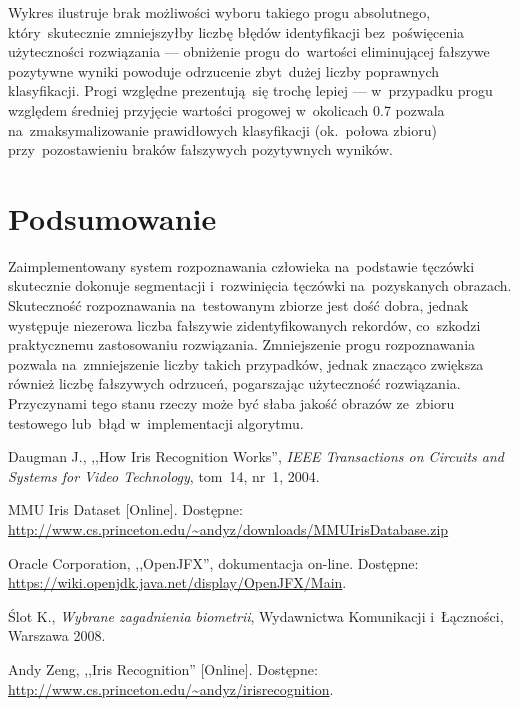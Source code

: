 \documentclass[11pt,a4paper]{article}
\begin{document}
Wykres ilustruje brak możliwości wyboru takiego progu absolutnego, który~skutecznie zmniejszyłby liczbę błędów identyfikacji bez~poświęcenia użyteczności rozwiązania --- obniżenie progu do~wartości eliminującej fałszywe pozytywne wyniki powoduje odrzucenie zbyt~dużej liczby poprawnych klasyfikacji.
Progi względne prezentują~się trochę lepiej --- w~przypadku progu względem średniej przyjęcie wartości progowej w~okolicach 0.7 pozwala na~zmaksymalizowanie prawidłowych klasyfikacji (ok.~połowa zbioru) przy~pozostawieniu braków fałszywych pozytywnych wyników.

\section{Podsumowanie}

Zaimplementowany system rozpoznawania człowieka na~podstawie tęczówki skutecznie dokonuje segmentacji i~rozwinięcia tęczówki na~pozyskanych obrazach.
Skuteczność rozpoznawania na~testowanym zbiorze jest dość dobra, jednak występuje niezerowa liczba fałszywie zidentyfikowanych rekordów, co~szkodzi praktycznemu zastosowaniu rozwiązania.
Zmniejszenie progu rozpoznawania pozwala na~zmniejszenie liczby takich przypadków, jednak znacząco zwiększa również liczbę fałszywych odrzuceń, pogarszając użyteczność rozwiązania.
Przyczynami tego stanu rzeczy może być słaba jakość obrazów ze~zbioru testowego lub~błąd w~implementacji algorytmu.

\begin{thebibliography}{9}

        Daugman J.,
        ,,How Iris Recognition Works'',
        \emph{IEEE Transactions on Circuits and Systems for Video Technology},
        tom~14,
        nr~1,
        2004.
        
        MMU Iris Dataset
        [Online].
        Dostępne: \url{http://www.cs.princeton.edu/~andyz/downloads/MMUIrisDatabase.zip}

        Oracle Corporation,
        ,,OpenJFX'',
        dokumentacja on-line.
        Dostępne: \url{https://wiki.openjdk.java.net/display/OpenJFX/Main}.

        Ślot K.,
        \emph{Wybrane zagadnienia biometrii},
        Wydawnictwa Komunikacji i~Łączności,
        Warszawa 2008.

        Andy Zeng,
        ,,Iris Recognition''
        [Online].
        Dostępne: \url{http://www.cs.princeton.edu/~andyz/irisrecognition}.

\end{thebibliography}
\end{document}
